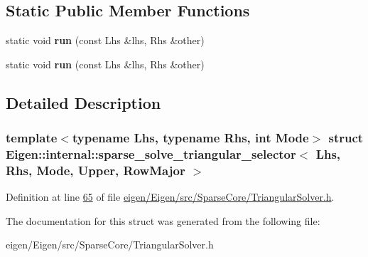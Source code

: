 \subsection*{Static Public Member Functions}
\begin{DoxyCompactItemize}
\item 
\mbox{\label{struct_eigen_1_1internal_1_1sparse__solve__triangular__selector_3_01_lhs_00_01_rhs_00_01_mode_00_01_upper_00_01_row_major_01_4_adfdae5994cca0e50d0a339f3a6c596f7}} 
static void {\bfseries run} (const Lhs \&lhs, Rhs \&other)
\item 
\mbox{\label{struct_eigen_1_1internal_1_1sparse__solve__triangular__selector_3_01_lhs_00_01_rhs_00_01_mode_00_01_upper_00_01_row_major_01_4_adfdae5994cca0e50d0a339f3a6c596f7}} 
static void {\bfseries run} (const Lhs \&lhs, Rhs \&other)
\end{DoxyCompactItemize}


\subsection{Detailed Description}
\subsubsection*{template$<$typename Lhs, typename Rhs, int Mode$>$\newline
struct Eigen\+::internal\+::sparse\+\_\+solve\+\_\+triangular\+\_\+selector$<$ Lhs, Rhs, Mode, Upper, Row\+Major $>$}



Definition at line \hyperlink{eigen_2_eigen_2src_2_sparse_core_2_triangular_solver_8h_source_l00065}{65} of file \hyperlink{eigen_2_eigen_2src_2_sparse_core_2_triangular_solver_8h_source}{eigen/\+Eigen/src/\+Sparse\+Core/\+Triangular\+Solver.\+h}.



The documentation for this struct was generated from the following file\+:\begin{DoxyCompactItemize}
\item 
eigen/\+Eigen/src/\+Sparse\+Core/\+Triangular\+Solver.\+h\end{DoxyCompactItemize}

